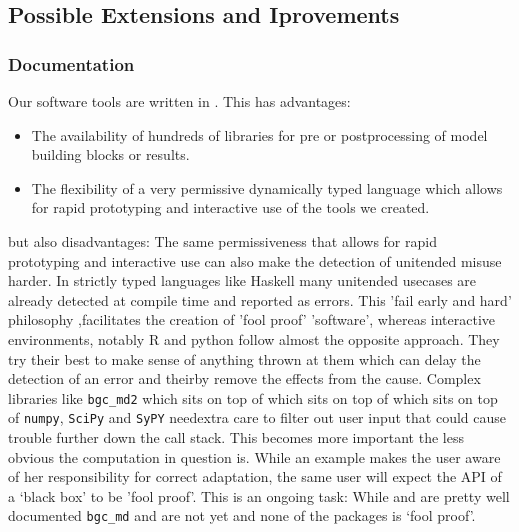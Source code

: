 \subsection{Possible Extensions and Iprovements}
\subsubsection{Documentation}
Our software tools are written in \python. 
This has advantages:
\begin{itemize}
  \item
  The availability of hundreds of libraries for pre or postprocessing of model building blocks or results.
  \item
  The flexibility of a very permissive dynamically typed language which allows for rapid prototyping and interactive use of the tools we created.
\end{itemize}
but also disadvantages: The same permissiveness that allows for rapid prototyping and interactive use can also make the detection of unitended misuse harder.
In strictly typed languages like Haskell many unitended usecases are already detected at compile time and reported as errors.
This 'fail early and hard' philosophy ,facilitates the creation of 'fool proof'
'software', whereas interactive environments, notably  R and python follow
almost the opposite approach.  They try their best to make sense of anything
thrown at them which can delay the detection of an error and theirby remove the effects from the cause.
Complex libraries like \texttt{bgc\_md2} which sits on top of \CompartmentalSystems which sits on top of \LAPM which sits on top of \texttt{numpy}, \texttt{SciPy} and \texttt{SyPY} 
needextra care to filter out user input that could cause trouble further down the call stack. This becomes more important the less obvious the computation in question is. 
While an example makes the user aware of her responsibility for correct adaptation, the same user will expect the API of a `black box' to be 'fool proof'. 
This is an ongoing task: While \LAPM and \CompartmentalSystems are pretty well documented 
\texttt{bgc\_md} and \ComputabilityGraphs are not yet and none of the packages is `fool proof'. 


